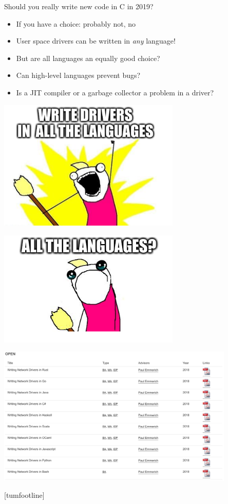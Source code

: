 \documentclass[NET,english,aspectratio=169,notitleframe]{tumbeamer}
\begin{document}
\begin{frame}{Should you really write new code in C in 2019?}
\begin{itemize}
\item If you have a choice: probably not, no
\pause
\item User space drivers can be written in \emph{any} language!
\item But are all languages an equally good choice?
\item Can high-level languages prevent bugs?
\item Is a JIT compiler or a garbage collector a problem in a driver?
\end{itemize}
\end{frame}

\begin{frame}{}
\centering\includegraphics[width=0.65\textwidth]{pics/allthe1}
\end{frame}

\begin{frame}{}
\centering\includegraphics[width=0.65\textwidth]{pics/allthe2}
\end{frame}

\begin{frame}{}
\centering\includegraphics[width=0.85\textwidth]{pics/theses}
\end{frame}
[tumfootline]
\end{document}

